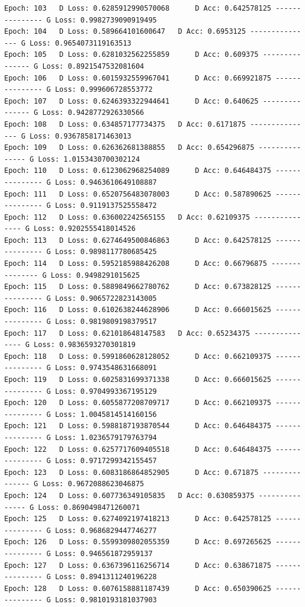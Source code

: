 \documentclass[11pt]{article}
\begin{document}
\begin{Verbatim}[commandchars=\\\{\}]
Epoch: 103 	 D Loss: 0.6285912990570068 	 D Acc: 0.642578125 --------------- G Loss: 0.9982739090919495
Epoch: 104 	 D Loss: 0.589664101600647 	 D Acc: 0.6953125 --------------- G Loss: 0.9654073119163513
Epoch: 105 	 D Loss: 0.6281032562255859 	 D Acc: 0.609375 --------------- G Loss: 0.8921547532081604
Epoch: 106 	 D Loss: 0.6015932559967041 	 D Acc: 0.669921875 --------------- G Loss: 0.999606728553772
Epoch: 107 	 D Loss: 0.6246393322944641 	 D Acc: 0.640625 --------------- G Loss: 0.9428772926330566
Epoch: 108 	 D Loss: 0.634857177734375 	 D Acc: 0.6171875 --------------- G Loss: 0.9367858171463013
Epoch: 109 	 D Loss: 0.626362681388855 	 D Acc: 0.654296875 --------------- G Loss: 1.0153430700302124
Epoch: 110 	 D Loss: 0.6123062968254089 	 D Acc: 0.646484375 --------------- G Loss: 0.9463610649108887
Epoch: 111 	 D Loss: 0.6520756483078003 	 D Acc: 0.587890625 --------------- G Loss: 0.9119137525558472
Epoch: 112 	 D Loss: 0.636002242565155 	 D Acc: 0.62109375 --------------- G Loss: 0.9202555418014526
Epoch: 113 	 D Loss: 0.6274649500846863 	 D Acc: 0.642578125 --------------- G Loss: 0.9898117780685425
Epoch: 114 	 D Loss: 0.5952185988426208 	 D Acc: 0.66796875 --------------- G Loss: 0.9498291015625
Epoch: 115 	 D Loss: 0.5889849662780762 	 D Acc: 0.673828125 --------------- G Loss: 0.9065722823143005
Epoch: 116 	 D Loss: 0.6102638244628906 	 D Acc: 0.666015625 --------------- G Loss: 0.9819809198379517
Epoch: 117 	 D Loss: 0.621018648147583 	 D Acc: 0.65234375 --------------- G Loss: 0.9836593270301819
Epoch: 118 	 D Loss: 0.5991860628128052 	 D Acc: 0.662109375 --------------- G Loss: 0.9743548631668091
Epoch: 119 	 D Loss: 0.6025831699371338 	 D Acc: 0.666015625 --------------- G Loss: 0.9704993367195129
Epoch: 120 	 D Loss: 0.6055877208709717 	 D Acc: 0.662109375 --------------- G Loss: 1.0045814514160156
Epoch: 121 	 D Loss: 0.5988187193870544 	 D Acc: 0.646484375 --------------- G Loss: 1.0236579179763794
Epoch: 122 	 D Loss: 0.6257717609405518 	 D Acc: 0.646484375 --------------- G Loss: 0.9717299342155457
Epoch: 123 	 D Loss: 0.6083186864852905 	 D Acc: 0.671875 --------------- G Loss: 0.9672088623046875
Epoch: 124 	 D Loss: 0.607736349105835 	 D Acc: 0.630859375 --------------- G Loss: 0.8690498471260071
Epoch: 125 	 D Loss: 0.6274092197418213 	 D Acc: 0.642578125 --------------- G Loss: 0.9686829447746277
Epoch: 126 	 D Loss: 0.5599309802055359 	 D Acc: 0.697265625 --------------- G Loss: 0.946561872959137
Epoch: 127 	 D Loss: 0.6367396116256714 	 D Acc: 0.638671875 --------------- G Loss: 0.8941311240196228
Epoch: 128 	 D Loss: 0.6076158881187439 	 D Acc: 0.650390625 --------------- G Loss: 0.9810193181037903

\end{Verbatim}
\end{document}
